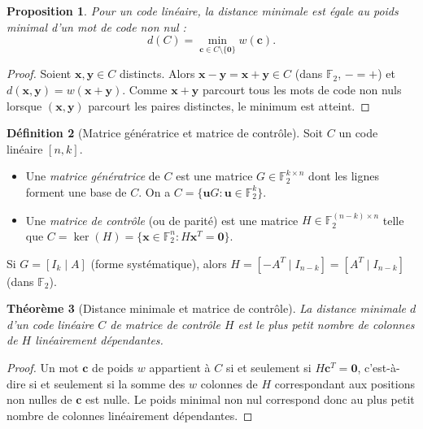 \documentclass[12pt,a4paper,openany]{book}
\theoremstyle{definition}
\newtheorem{definition}{Définition}[chapter]
\theoremstyle{plain}
\newtheorem{theoreme}[definition]{Théorème}
\newtheorem{proposition}[definition]{Proposition}
\theoremstyle{remark}
\begin{document}
\begin{proposition}
Pour un code linéaire, la distance minimale est égale au poids minimal
d'un mot de code non nul :
\[
  d(C) = \min_{\mathbf{c} \in C \setminus \{\mathbf{0}\}} w(\mathbf{c}).
\]
\end{proposition}

\begin{proof}
Soient $\mathbf{x}, \mathbf{y} \in C$ distincts. Alors
$\mathbf{x} - \mathbf{y} = \mathbf{x} + \mathbf{y} \in C$ (dans
$\mathbb{F}_2$, $- = +$) et
$d(\mathbf{x}, \mathbf{y}) = w(\mathbf{x}+\mathbf{y})$. Comme
$\mathbf{x}+\mathbf{y}$ parcourt tous les mots de code non nuls lorsque
$(\mathbf{x},\mathbf{y})$ parcourt les paires distinctes, le minimum est
atteint.
\end{proof}

\begin{definition}[Matrice génératrice et matrice de contrôle]
\label{def:matrice-generatrice}
Soit $C$ un code linéaire $[n,k]$.
\begin{itemize}
  \item Une \emph{matrice génératrice} de $C$ est une matrice
        $G \in \mathbb{F}_2^{k \times n}$ dont les lignes forment une
        base de $C$. On a $C = \{\mathbf{u} G : \mathbf{u} \in
        \mathbb{F}_2^k\}$.
  \item Une \emph{matrice de contrôle} (ou de parité) est une matrice
        $H \in \mathbb{F}_2^{(n-k) \times n}$ telle que
        $C = \ker(H) = \{\mathbf{x} \in \mathbb{F}_2^n : H\mathbf{x}^T
        = \mathbf{0}\}$.
\end{itemize}
Si $G = [I_k \mid A]$ (forme systématique), alors $H = [-A^T \mid
I_{n-k}] = [A^T \mid I_{n-k}]$ (dans $\mathbb{F}_2$).
\end{definition}

\begin{theoreme}[Distance minimale et matrice de contrôle]
\label{thm:distance-H}
La distance minimale $d$ d'un code linéaire $C$ de matrice de contrôle $H$
est le plus petit nombre de colonnes de $H$ linéairement dépendantes.
\end{theoreme}

\begin{proof}
Un mot $\mathbf{c}$ de poids $w$ appartient à $C$ si et seulement si
$H\mathbf{c}^T = \mathbf{0}$, c'est-à-dire si et seulement si la somme
des $w$ colonnes de $H$ correspondant aux positions non nulles de
$\mathbf{c}$ est nulle. Le poids minimal non nul correspond donc au plus
petit nombre de colonnes linéairement dépendantes.
\end{proof}
\end{document}
